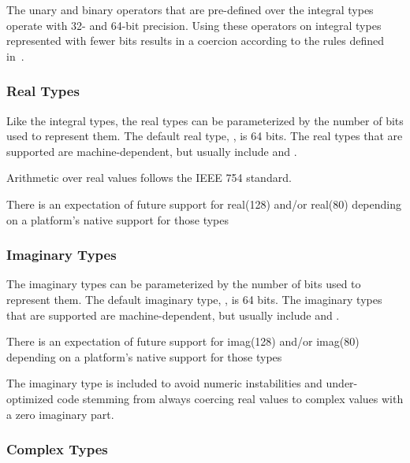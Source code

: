 The unary and binary operators that are pre-defined over the integral
types operate with 32- and 64-bit precision.  Using these operators on
integral types represented with fewer bits results in a coercion
according to the rules defined in~.

\subsubsection{Real Types}
\label{Real_Types}

Like the integral types, the real types can be parameterized by the
number of bits used to represent them.  The default real
type, , is 64 bits.  The real types that are supported are
machine-dependent, but usually include 
and .

Arithmetic over real values follows the IEEE 754 standard.

\begin{openissue}
There is an expectation of future support for real(128) and/or
real(80) depending on a platform's native support for those types
\end{openissue}

\subsubsection{Imaginary Types}
\label{Imaginary_Types}

The imaginary types can be parameterized by the number of bits used to
represent them.  The default imaginary type, , is 64 bits.
The imaginary types that are supported are machine-dependent, but
usually include  and .

\begin{openissue}
There is an expectation of future support for imag(128) and/or
imag(80) depending on a platform's native support for those types
\end{openissue}

\begin{rationale}
The imaginary type is included to avoid numeric instabilities and
under-optimized code stemming from always coercing real values to
complex values with a zero imaginary part.
\end{rationale}

\subsubsection{Complex Types}
\label{Complex_Types}


